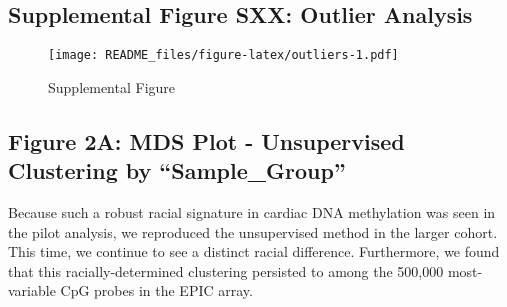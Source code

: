 \documentclass[
  10pt,
]{article}
\newenvironment{Shaded}{\begin{snugshade}}{\end{snugshade}}
\newcommand{\AttributeTok}[1]{\textcolor[rgb]{0.77,0.63,0.00}{#1}}
\newcommand{\DecValTok}[1]{\textcolor[rgb]{0.00,0.00,0.81}{#1}}
\newcommand{\FloatTok}[1]{\textcolor[rgb]{0.00,0.00,0.81}{#1}}
\newcommand{\FunctionTok}[1]{\textcolor[rgb]{0.00,0.00,0.00}{#1}}
\newcommand{\NormalTok}[1]{#1}
\newcommand{\SpecialCharTok}[1]{\textcolor[rgb]{0.00,0.00,0.00}{#1}}
\newcommand{\StringTok}[1]{\textcolor[rgb]{0.31,0.60,0.02}{#1}}
\begin{document}
\hypertarget{supplemental-figure-sxx-outlier-analysis}{%
\subsection{Supplemental Figure SXX: Outlier
Analysis}\label{supplemental-figure-sxx-outlier-analysis}}

\begin{Shaded}
\end{Shaded}

\begin{figure}
\centering
\texttt{[image: README\_files/figure-latex/outliers-1.pdf]}
\caption{Supplemental Figure}
\end{figure}

\hypertarget{figure-2a-mds-plot---unsupervised-clustering-by-sample_group}{%
\subsection{Figure 2A: MDS Plot - Unsupervised Clustering by
``Sample\_Group''}\label{figure-2a-mds-plot---unsupervised-clustering-by-sample_group}}

Because such a robust racial signature in cardiac DNA methylation was
seen in the pilot analysis, we reproduced the unsupervised method in the
larger cohort. This time, we continue to see a distinct racial
difference. Furthermore, we found that this racially-determined
clustering persisted to among the 500,000 most-variable CpG probes in
the EPIC array.
\end{document}

